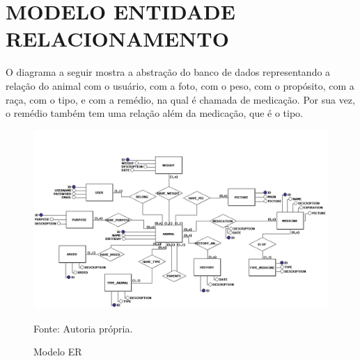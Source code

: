 \section{MODELO ENTIDADE RELACIONAMENTO}

O diagrama a seguir mostra a abstração do banco de dados representando a relação do animal
com o usuário, com a foto, com o peso, com o propósito, com a raça, com o tipo, e com a remédio,
na qual é chamada de medicação. Por sua vez, o remédio também tem uma relação além da
medicação, que é o tipo.

\begin{figure}[H]
	\begin{center}
		\caption{Modelo ER}
		\includegraphics[width=\textwidth]{../img/erdoboi.jpg}

		Fonte: Autoria própria.
	\end{center}
\end{figure}
